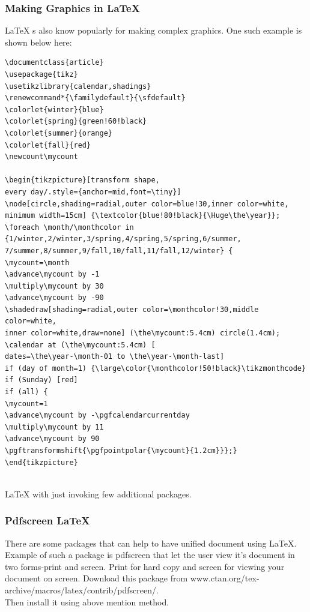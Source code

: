 \subsubsection{Making Graphics in \LaTeX{}}
\LaTeX{} s also know popularly for making complex graphics. One such example is shown below here:\\
\begin{verbatim}
\documentclass{article}
\usepackage{tikz}
\usetikzlibrary{calendar,shadings}
\renewcommand*{\familydefault}{\sfdefault}
\colorlet{winter}{blue}
\colorlet{spring}{green!60!black}
\colorlet{summer}{orange}
\colorlet{fall}{red}
\newcount\mycount

\begin{tikzpicture}[transform shape,
every day/.style={anchor=mid,font=\tiny}]
\node[circle,shading=radial,outer color=blue!30,inner color=white,
minimum width=15cm] {\textcolor{blue!80!black}{\Huge\the\year}};
\foreach \month/\monthcolor in
{1/winter,2/winter,3/spring,4/spring,5/spring,6/summer,
7/summer,8/summer,9/fall,10/fall,11/fall,12/winter} {
\mycount=\month
\advance\mycount by -1
\multiply\mycount by 30
\advance\mycount by -90
\shadedraw[shading=radial,outer color=\monthcolor!30,middle color=white,
inner color=white,draw=none] (\the\mycount:5.4cm) circle(1.4cm);
\calendar at (\the\mycount:5.4cm) [
dates=\the\year-\month-01 to \the\year-\month-last]
if (day of month=1) {\large\color{\monthcolor!50!black}\tikzmonthcode}
if (Sunday) [red]
if (all) {
\mycount=1
\advance\mycount by -\pgfcalendarcurrentday
\multiply\mycount by 11
\advance\mycount by 90
\pgftransformshift{\pgfpointpolar{\mycount}{1.2cm}}};}
\end{tikzpicture}

\end{verbatim}\\
\LaTeX{} with just invoking few additional packages.

\subsubsection{Pdfscreen \LaTeX{}}
There are some packages that can help to have unified document using \LaTeX{}. Example of such a package is pdfscreen that let the user view it’s document in two forms-print and screen. Print for hard copy and screen for viewing your document on screen. Download this package from www.ctan.org/tex-archive/macros/latex/contrib/pdfscreen/.\\
Then install it using above mention method.\\

